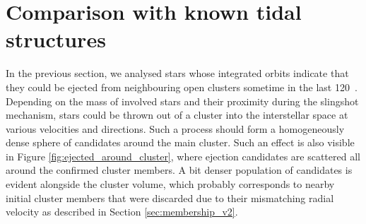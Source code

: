 \section{Comparison with known tidal structures}
\label{sec:tails_chem}
In the previous section, we analysed stars whose integrated orbits indicate that they could be ejected from neighbouring open clusters sometime in the last 120~\myr. Depending on the mass of involved stars and their proximity during the slingshot mechanism, stars could be thrown out of a cluster into the interstellar space at various velocities and directions. Such a process should form a homogeneously dense sphere of candidates around the main cluster. Such an effect is also visible in Figure \ref{fig:ejected_around_cluster}, where ejection candidates are scattered all around the confirmed cluster members. A bit denser population of candidates is evident alongside the cluster volume, which probably corresponds to nearby initial cluster members that were discarded due to their mismatching radial velocity as described in Section   \ref{sec:membership_v2}.

